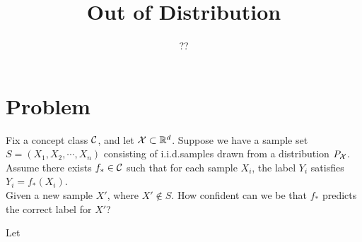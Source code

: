 \documentclass[11pt,fullpage]{article}
\begin{document}
\title{Out of Distribution}
\author{??}
\maketitle

\section{Problem}
Fix a concept class $ {\mathcal{C}} $,
and let ${\mathcal{X}}  \subset {{\mathbb{R}}}^d$. Suppose we have a sample set $S=(X_1, X_2,\cdots, X_n)$ consisting of i.i.d.samples drawn from a distribution $P_{{\mathcal{X}}}$. Assume there exists $f_*\in {\mathcal{C}}$ 
such that  for each sample $X_i$, the label $Y_i$ satisfies $ Y_i = f_*(X_i)$. \\
Given a new sample $X'$, where $X'\notin S$. How confident can we be that $f_*$ predicts the correct label for $X'$?

\begin{example}
Let 
\end{example}



\end{document}
